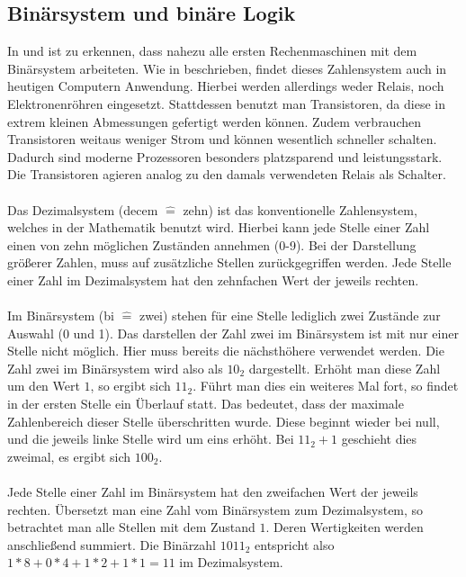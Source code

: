 \subsection{Binärsystem und binäre Logik} \label{BinarySystem}
In \cite{konradz1z2} und \cite{bruderer2011konrad} ist zu erkennen, dass nahezu alle ersten Rechenmaschinen mit dem Binärsystem arbeiteten. Wie in \cite{zimmermann1998binary} beschrieben, findet dieses Zahlensystem auch in heutigen Computern Anwendung. Hierbei werden allerdings weder Relais, noch Elektronenröhren eingesetzt. Stattdessen benutzt man Transistoren, da diese in extrem kleinen Abmessungen gefertigt werden können. Zudem verbrauchen Transistoren weitaus weniger Strom und können wesentlich schneller schalten. Dadurch sind moderne Prozessoren besonders platzsparend und leistungsstark. Die Transistoren agieren analog zu den damals verwendeten Relais als Schalter.\\\\
Das Dezimalsystem (\glqq{}decem\grqq{} $\widehat{=}$ zehn) ist das konventionelle Zahlensystem, welches in der Mathematik benutzt wird. Hierbei kann jede Stelle einer Zahl einen von zehn möglichen Zuständen annehmen (0-9). Bei der Darstellung größerer Zahlen, muss auf zusätzliche Stellen zurückgegriffen werden. Jede Stelle einer Zahl im Dezimalsystem hat den zehnfachen Wert der jeweils rechten.\\\\
Im Binärsystem (\glqq{}bi\grqq{} $\widehat{=}$ zwei) stehen für eine Stelle lediglich zwei Zustände zur Auswahl (0 und 1). Das darstellen der Zahl zwei im Binärsystem ist mit nur einer Stelle nicht möglich. Hier muss bereits die nächsthöhere verwendet werden. Die Zahl zwei im Binärsystem wird also als $10_2$ dargestellt. Erhöht man diese Zahl um den Wert $1$, so ergibt sich $11_2$. Führt man dies ein weiteres Mal fort, so findet in der ersten Stelle ein \glqq{}Überlauf\grqq{} statt. Das bedeutet, dass der maximale Zahlenbereich dieser Stelle überschritten wurde. Diese beginnt wieder bei null, und die jeweils linke Stelle wird um eins erhöht. Bei $11_2 + 1$ geschieht dies zweimal, es ergibt sich $100_2$.\\\\
Jede Stelle einer Zahl im Binärsystem hat den zweifachen Wert der jeweils rechten. Übersetzt man eine Zahl vom Binärsystem zum Dezimalsystem, so betrachtet man alle Stellen mit dem Zustand $1$. Deren Wertigkeiten werden anschließend summiert. Die Binärzahl $1011_2$ entspricht also $1*8 + 0*4 + 1*2 + 1*1 = 11$ im Dezimalsystem.\\\\
